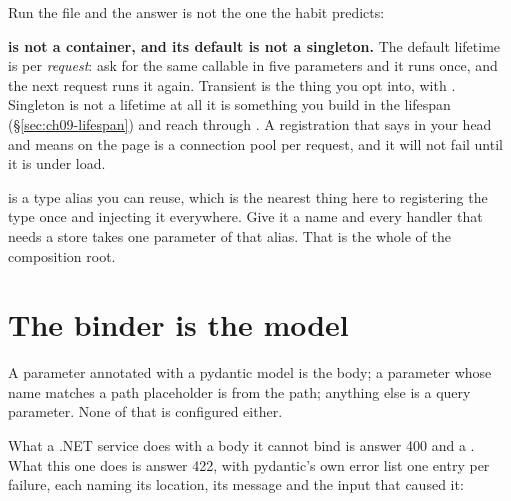 
\noindent
Run the file and the answer is not the one the habit predicts:


\begin{trapbox}
\textbf{ is not a container, and its default is not a
singleton.} The default lifetime is per \emph{request}: ask for the same
callable in five parameters and it runs once, and the next request runs it
again. Transient is the thing you opt into, with
. Singleton is not a lifetime at all
\dash{} it is something you build in the lifespan (\S\ref{sec:ch09-lifespan})
and reach through . A registration that says
 in your head and means  on the page is a
connection pool per request, and it will not fail until it is under load.
\end{trapbox}


\begin{csbox}
 is a type alias you can reuse,
which is the nearest thing here to registering the type once and injecting
it everywhere. Give it a name \dash{}  \dash{} and every
handler that needs a store takes one parameter of that alias. That is the
whole of the composition root.
\end{csbox}

\section{The binder is the model}
\label{sec:ch09-validation}

A parameter annotated with a pydantic model is the body; a parameter whose
name matches a path placeholder is from the path; anything else is a query
parameter. None of that is configured either.


\noindent
What a .NET service does with a body it cannot bind is answer 400 and a
. What this one does is answer 422, with pydantic's own
error list \dash{} one entry per failure, each naming its location, its
message and the input that caused it:

